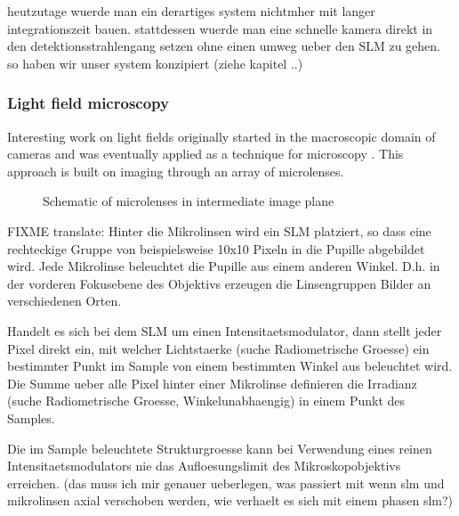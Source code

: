 heutzutage wuerde man ein derartiges system nichtmher mit langer
integrationszeit bauen. stattdessen wuerde man eine schnelle kamera
direkt in den detektionsstrahlengang setzen ohne einen umweg ueber den
SLM zu gehen. so haben wir unser system konzipiert (ziehe kapitel ..)

%
%
%

\subsubsection{Light field microscopy}
\label{sec:light-field-microscopy}
Interesting work on light fields originally started in the macroscopic
domain of cameras \citep{Lippmann1908%
} and was eventually applied as a technique for microscopy
\citep{Levoy2006,Levoy2009,Zhang2009}. This approach is built on
imaging through an array of microlenses.
\begin{figure}[!hbt]
  \centering
  \caption{Schematic of microlenses in intermediate image plane
    \citep[inspired from][]{Levoy2006}}
  \label{fig:microlens-levoy-sketch}
\end{figure}

FIXME translate: Hinter die Mikrolinsen wird ein SLM platziert, so
dass eine rechteckige Gruppe von beispielsweise 10x10 Pixeln in die
Pupille abgebildet wird. Jede Mikrolinse beleuchtet die Pupille aus
einem anderen Winkel. D.h. in der vorderen Fokusebene des Objektivs
erzeugen die Linsengruppen Bilder an verschiedenen Orten.

Handelt es sich bei dem SLM um einen Intensitaetsmodulator, dann
stellt jeder Pixel direkt ein, mit welcher Lichtstaerke (suche
Radiometrische Groesse) ein bestimmter Punkt im Sample von einem
bestimmten Winkel aus beleuchtet wird.  Die Summe ueber alle Pixel
hinter einer Mikrolinse definieren die Irradianz (suche Radiometrische
Groesse, Winkelunabhaengig) in einem Punkt des Samples.

Die im Sample beleuchtete Strukturgroesse kann bei Verwendung eines
reinen Intensitaetsmodulators nie das Aufloesungslimit des
Mikroskopobjektivs erreichen. (das muss ich mir genauer ueberlegen,
was passiert mit wenn slm und mikrolinsen axial verschoben werden, wie
verhaelt es sich mit einem phasen slm?)


